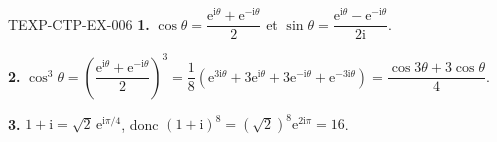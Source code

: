 \begin{corrige}{TEXP-CTP-EX-006}
\textbf{1.} $\cos\theta=\dfrac{\mathrm{e}^{\mathrm{i}\theta}
+\mathrm{e}^{-\mathrm{i}\theta}}{2}$ et
$\sin\theta=\dfrac{\mathrm{e}^{\mathrm{i}\theta}
-\mathrm{e}^{-\mathrm{i}\theta}}{2\mathrm{i}}$.

\textbf{2.} $\cos^3\theta
=\left(\dfrac{\mathrm{e}^{\mathrm{i}\theta}+\mathrm{e}^{-\mathrm{i}\theta}}{2}
\right)^3=\dfrac{1}{8}\left(\mathrm{e}^{3\mathrm{i}\theta}
+3\mathrm{e}^{\mathrm{i}\theta}+3\mathrm{e}^{-\mathrm{i}\theta}
+\mathrm{e}^{-3\mathrm{i}\theta}\right)
=\dfrac{\cos3\theta+3\cos\theta}{4}$.

\textbf{3.} $1+\mathrm{i}=\sqrt2\,\mathrm{e}^{\mathrm{i}\pi/4}$, donc
$(1+\mathrm{i})^8=(\sqrt2)^8\mathrm{e}^{2\mathrm{i}\pi}=16$.
\end{corrige}
